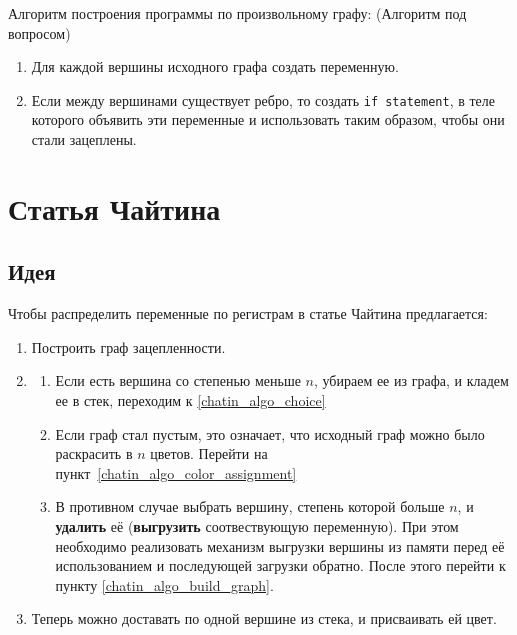 Алгоритм построения программы по произвольному графу: (Алгоритм под вопросом)

\begin{enumerate} %
    \item Для каждой вершины исходного графа создать переменную.
    \item Если между вершинами существует ребро, то создать \texttt{if statement}, в теле
    которого объявить эти переменные и использовать таким образом, чтобы они стали зацеплены.
\end{enumerate}


\section{Статья Чайтина}

\subsection{Идея}

Чтобы распределить переменные по регистрам в статье Чайтина предлагается:

\begin{enumerate}
    \item Построить граф зацепленности.\label{chatin_algo_build_graph}
    \item \label{chatin_algo_choice}\begin{enumerate}
        \item Если есть вершина со степенью меньше $n$, убираем ее из графа, и кладем ее в стек, переходим
        к \ref{chatin_algo_choice}
        \item Если граф стал пустым, это означает, что исходный граф можно было раскрасить в $n$ цветов.
        Перейти на пункт~\ref{chatin_algo_color_assignment}
        \item В противном случае выбрать вершину, степень которой больше $n$, и \textbf{удалить} её (\textbf{выгрузить} соотвествующую переменную).
        При этом необходимо реализовать механизм выгрузки вершины из памяти перед её использованием и
        последующей загрузки обратно. После этого перейти к пункту \ref{chatin_algo_build_graph}.
        \label{chatin_algo_spill}
    \end{enumerate}

    \item Теперь можно доставать по одной вершине из стека, и присваивать ей цвет. \label{chatin_algo_color_assignment}
\end{enumerate}

